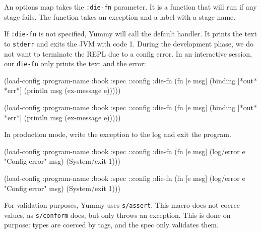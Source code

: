 An options map takes the \verb|:die-fn| parameter. It is a function that will run if any stage fails. The function takes an exception and a label with a stage name.


If \verb|:die-fn| is not specified, Yummy will call the default handler. It prints the text to \verb|stderr| and exits the JVM with code 1. During the development phase, we do not want to terminate the REPL due to a config error. In an interactive session, our \verb|die-fn| only prints the text and the error:

\ifx\DEVICETYPE\MOBILE

\begin{clojure}
(load-config
 {:program-name :book
  :spec ::config
  :die-fn (fn [e msg]
            (binding [*out* *err*]
              (println msg
                (ex-message e))))})
\end{clojure}

\else

\begin{clojure}
(load-config
 {:program-name :book
  :spec ::config
  :die-fn (fn [e msg]
            (binding [*out* *err*]
              (println msg (ex-message e))))})
\end{clojure}

\fi

\noindent
In production mode, write the exception to the log and exit the program.


\ifx\DEVICETYPE\MOBILE

\begin{clojure}
(load-config
 {:program-name :book
  :spec ::config
  :die-fn (fn [e msg]
            (log/error e
              "Config error" msg)
            (System/exit 1))})
\end{clojure}

\else

\begin{clojure}
(load-config
 {:program-name :book
  :spec ::config
  :die-fn (fn [e msg]
            (log/error e "Config error" msg)
            (System/exit 1))})
\end{clojure}

\fi

For validation purposes, Yummy uses \verb|s/assert|. This macro does not coerce values, as \verb|s/conform| does, but only throws an exception. This is done on purpose: types are coerced by tags, and the spec only validates them.

